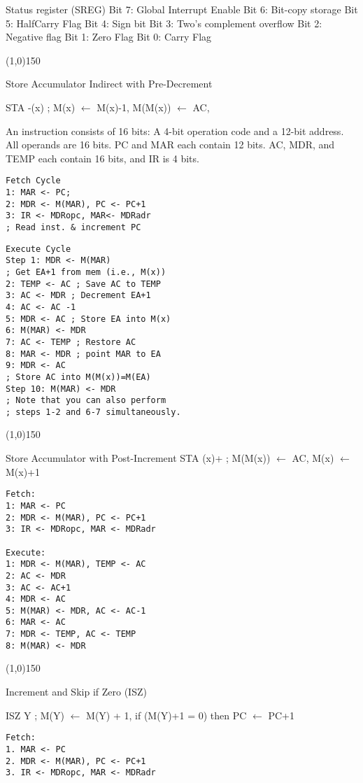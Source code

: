 \documentclass[8pt]{article}
\begin{document}
\begin{multicols}{3}
Status register (SREG) 
Bit 7: Global Interrupt Enable
Bit 6: Bit-copy storage
Bit 5: HalfCarry Flag
Bit 4: Sign bit
Bit 3: Two's complement overflow
Bit 2: Negative flag
Bit 1: Zero Flag
Bit 0: Carry Flag


\line(1,0){150}

Store Accumulator Indirect with Pre-Decrement

STA -(x) ; M(x) $\leftarrow$ M(x)-1, M(M(x)) $\leftarrow$ AC,

An instruction consists of 16 bits: A 4-bit operation code and a 12-bit
address. All operands are 16 bits. PC and MAR each contain 12 bits. AC, MDR,
and TEMP each contain 16 bits, and IR is 4 bits.


\begin{verbatim}
Fetch Cycle
1: MAR <- PC;
2: MDR <- M(MAR), PC <- PC+1
3: IR <- MDRopc, MAR<- MDRadr 
; Read inst. & increment PC
\end{verbatim}

\begin{verbatim}
Execute Cycle
Step 1: MDR <- M(MAR) 
; Get EA+1 from mem (i.e., M(x))
2: TEMP <- AC ; Save AC to TEMP
3: AC <- MDR ; Decrement EA+1
4: AC <- AC -1
5: MDR <- AC ; Store EA into M(x)
6: M(MAR) <- MDR
7: AC <- TEMP ; Restore AC
8: MAR <- MDR ; point MAR to EA
9: MDR <- AC 
; Store AC into M(M(x))=M(EA)
Step 10: M(MAR) <- MDR
; Note that you can also perform 
; steps 1-2 and 6-7 simultaneously.
\end{verbatim}


\line(1,0){150}

Store Accumulator with Post-Increment
STA (x)+ ; M(M(x)) $\leftarrow$ AC, M(x) $\leftarrow$ M(x)+1

\begin{verbatim}
Fetch: 
1: MAR <- PC
2: MDR <- M(MAR), PC <- PC+1
3: IR <- MDRopc, MAR <- MDRadr

Execute: 
1: MDR <- M(MAR), TEMP <- AC
2: AC <- MDR
3: AC <- AC+1
4: MDR <- AC
5: M(MAR) <- MDR, AC <- AC-1
6: MAR <- AC
7: MDR <- TEMP, AC <- TEMP
8: M(MAR) <- MDR
\end{verbatim}

\line(1,0){150}

Increment and Skip if Zero (ISZ)

ISZ Y ; M(Y) $\leftarrow$ M(Y) + 1, if (M(Y)+1 = 0) then PC $\leftarrow$ PC+1

\begin{verbatim}
Fetch: 
1. MAR <- PC
2. MDR <- M(MAR), PC <- PC+1
3. IR <- MDRopc, MAR <- MDRadr


\end{verbatim}
\end{multicols}
\end{document}

